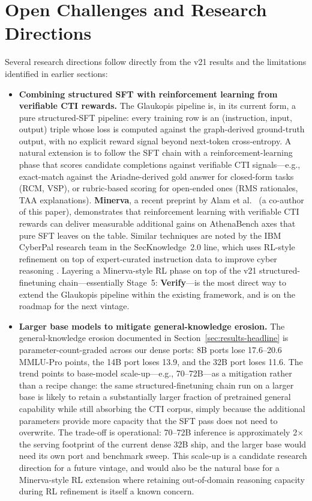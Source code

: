 \documentclass[unnumsec,webpdf,contemporary,large]{oup-authoring-template}
\theoremstyle{thmstyleone}
\theoremstyle{thmstyletwo}
\theoremstyle{thmstylethree}
\begin{document}
\section{Open Challenges and Research Directions}
\label{sec:open-challenges}

Several research directions follow directly from the v21 results and the limitations identified in earlier sections:

\begin{itemize}
  \item \textbf{Combining structured SFT with reinforcement learning from verifiable CTI rewards.} The Glaukopis pipeline is, in its current form, a pure structured-SFT pipeline: every training row is an (instruction, input, output) triple whose loss is computed against the graph-derived ground-truth output, with no explicit reward signal beyond next-token cross-entropy. A natural extension is to follow the SFT chain with a reinforcement-learning phase that scores candidate completions against verifiable CTI signals---e.g., exact-match against the Ariadne-derived gold answer for closed-form tasks (RCM, VSP), or rubric-based scoring for open-ended ones (RMS rationales, TAA explanations). \textbf{Minerva}, a recent preprint by Alam et al.\ \cite{alam2026minerva} (a co-author of this paper), demonstrates that reinforcement learning with verifiable CTI rewards can deliver measurable additional gains on AthenaBench axes that pure SFT leaves on the table. Similar techniques are noted by the IBM CyberPal research team in the SecKnowledge~2.0 line, which uses RL-style refinement on top of expert-curated instruction data to improve cyber reasoning \cite{levi2025toward}. Layering a Minerva-style RL phase on top of the v21 structured-finetuning chain---essentially Stage~5: \textbf{Verify}---is the most direct way to extend the Glaukopis pipeline within the existing framework, and is on the roadmap for the next vintage.
  \item \textbf{Larger base models to mitigate general-knowledge erosion.} The general-knowledge erosion documented in Section~\ref{sec:results-headline} is parameter-count-graded across our dense ports: 8B ports lose 17.6--20.6 MMLU-Pro points, the 14B port loses 13.9, and the 32B port loses 11.6. The trend points to base-model scale-up---e.g., 70--72B---as a mitigation rather than a recipe change: the same structured-finetuning chain run on a larger base is likely to retain a substantially larger fraction of pretrained general capability while still absorbing the CTI corpus, simply because the additional parameters provide more capacity that the SFT pass does not need to overwrite. The trade-off is operational: 70--72B inference is approximately 2$\times$ the serving footprint of the current dense 32B ship, and the larger base would need its own port and benchmark sweep. This scale-up is a candidate research direction for a future vintage, and would also be the natural base for a Minerva-style RL extension where retaining out-of-domain reasoning capacity during RL refinement is itself a known concern.

\end{itemize}
\end{document}
